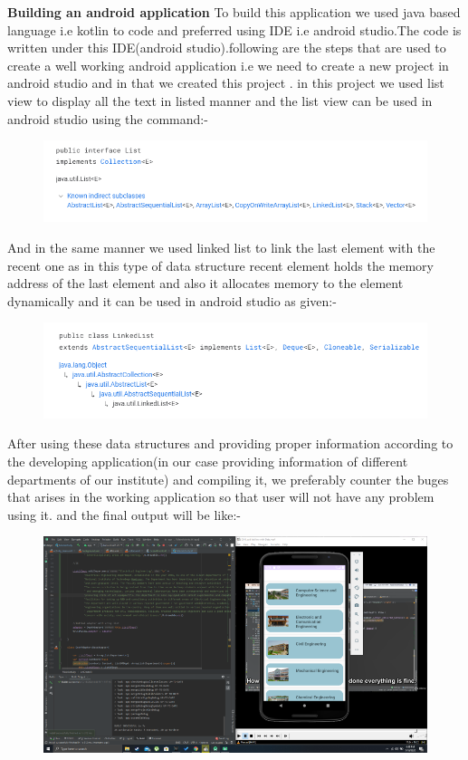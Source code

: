 \documentclass[11pt,a4paper]{report}
\begin{document}
		\vskip 7cm
		\textbf{{\large{Building an android application}}}
		\vskip 0.5cm
		To build this application we used java based language i.e kotlin to code and preferred using IDE i.e android studio.The code is written under this IDE(android studio).following are the steps that are used to create a well working android application i.e we need to create a new project in android studio and in that we created this project . in this project we used list view to display all the text in listed manner and the list view can be used in android studio using the command:-\\
		\begin{figure}[H]
		    \centering
		    \includegraphics[scale=0.75]{Screenshot (146).png}
		\end{figure}
 	 	And in the same manner we used linked list to link the last element with the recent one as in this type of data structure recent element holds the memory address of the last element and also it allocates memory to the element dynamically and it can be used in android studio as given:-\\
 	 	   \begin{figure}[H]
 	 	       \centering
 	 	       \includegraphics[scale=0.75]{Screenshot (145).png}
 	 	   \end{figure}
 	 	   After using these data structures and providing proper information according to the developing application(in our case providing information of different departments of our institute) and compiling it, we preferably counter the buges that arises in the working application so that user will not have any problem using it.
 	 	   and the final output will be like:-
 	 	   \vskip 5cm
 	 	   \begin{figure}[H]
 	 	       \centering
 	 	       \includegraphics[scale=0.55]{Screenshot_59.png}
 	 	   \end{figure}
\end{document}
